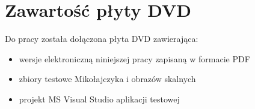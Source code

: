\documentclass[oneside]{mgr}
\begin{document}
\chapter{Zawartość płyty DVD}
Do pracy została dołączona płyta DVD zawierająca:
\begin{itemize}
\item wersje elektroniczną niniejszej pracy zapisaną w formacie PDF
\item zbiory testowe Mikołajczyka i obrazów skalnych
\item projekt MS Visual Studio aplikacji testowej
\end{itemize}






 \listoffigures
 \listoftables
\end{document}
